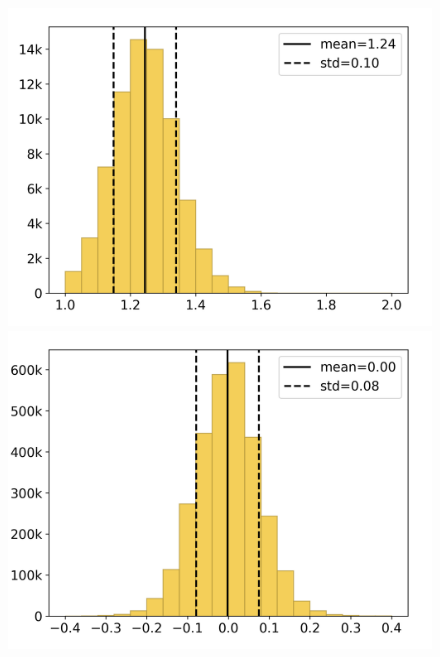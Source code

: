 \begin{figure}[H]
	\begin{minipage}{.325\textwidth}
		\includegraphics[width=\textwidth, trim=.25cm 0.25cm .25cm 0.25cm]{Resources/Images/Histogram/hist_1_b.png}
	\end{minipage}
	\begin{minipage}{.325\textwidth}
		\includegraphics[width=\textwidth, clip, trim=.25cm 0.25cm .25cm 0.25cm]{Resources/Images/Histogram/hist_2_b.png}
	\end{minipage}
	\begin{minipage}{.325\textwidth}

\end{minipage}
\end{figure}
